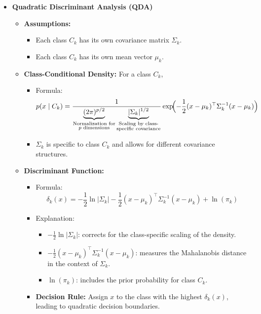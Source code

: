\documentclass[10pt]{article}
\begin{document}
\begin{itemize}
    \item \textbf{Quadratic Discriminant Analysis (QDA)}
    \begin{itemize}
        \item \textbf{Assumptions:}
        \begin{itemize}
            \item Each class \(C_k\) has its own covariance matrix \(\Sigma_k\).
            \item Each class \(C_k\) has its own mean vector \(\mu_k\).
        \end{itemize}
        \item \textbf{Class-Conditional Density:} For a class \(C_k\),
        \begin{itemize}
            \item Formula:
            \[
            p(x \mid C_k) = \frac{1}{\underbrace{(2\pi)^{p/2}}_{\substack{\text{Normalization for} \\ \text{\(p\) dimensions}}} \underbrace{|\Sigma_k|^{1/2}}_{\substack{\text{Scaling by class-} \\ \text{specific covariance}}}} \exp\!\Bigl(-\frac{1}{2}(x-\mu_k)^\top\Sigma_k^{-1}(x-\mu_k)\Bigr)
            \]
            \item \(\Sigma_k\) is specific to class \(C_k\) and allows for different covariance structures.
        \end{itemize}
        \item \textbf{Discriminant Function:}
        \begin{itemize}
            \item Formula:
            \[
            \delta_k(x) = -\frac{1}{2}\ln|\Sigma_k| - \frac{1}{2}(x-\mu_k)^\top\Sigma_k^{-1}(x-\mu_k) + \ln(\pi_k)
            \]
            \item Explanation:
            \begin{itemize}
                \item \(-\frac{1}{2}\ln|\Sigma_k|\): corrects for the class-specific scaling of the density.
                \item \(-\frac{1}{2}(x-\mu_k)^\top\Sigma_k^{-1}(x-\mu_k)\): measures the Mahalanobis distance in the context of \(\Sigma_k\).
                \item \(\ln(\pi_k)\): includes the prior probability for class \(C_k\).
            \end{itemize}
            \item \textbf{Decision Rule:} Assign \(x\) to the class with the highest \(\delta_k(x)\), leading to quadratic decision boundaries.

\end{itemize}
\end{itemize}
\end{itemize}
\end{document}
